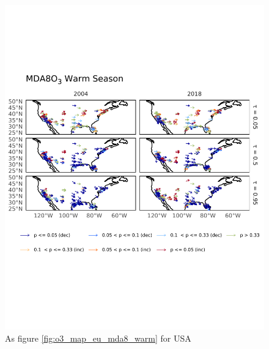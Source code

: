 \documentclass[journal abbreviation, manuscript]{copernicus}
\begin{document}
\begin{figure}[h!]
\centering
\includegraphics[height=0.9\textheight]{figures/paper_figures/o3_map/o3_map_piecewise_stats_freeTau_mda8_anom_warm_us_o3.pdf}
\caption{As figure \ref{fig:o3_map_eu_mda8_warm} for USA}
\label{fig:o3_map_us_mda8_warm}
\end{figure}
\end{document}
